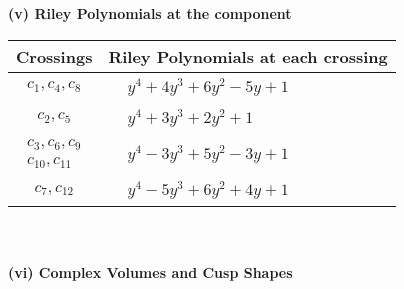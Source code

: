 \documentclass[1p]{elsarticle_modified}
\theoremstyle{definition}
\begin{document}
\newpage\renewcommand{\arraystretch}{1}
\flushleft \textbf{(v) Riley Polynomials at the component}\newline \\
\begin{tabular}{m{50pt}|m{274pt}}
Crossings & \hspace{64pt}Riley Polynomials at each crossing \\
\hline $$\begin{aligned}c_{1},c_{4},c_{8}\end{aligned}$$&$\begin{aligned}
&y^4+4 y^3+6 y^2-5 y+1
\end{aligned}$\\
\hline $$\begin{aligned}c_{2},c_{5}\end{aligned}$$&$\begin{aligned}
&y^4+3 y^3+2 y^2+1
\end{aligned}$\\
\hline $$\begin{aligned}c_{3},c_{6},c_{9}\\c_{10},c_{11}\end{aligned}$$&$\begin{aligned}
&y^4-3 y^3+5 y^2-3 y+1
\end{aligned}$\\
\hline $$\begin{aligned}c_{7},c_{12}\end{aligned}$$&$\begin{aligned}
&y^4-5 y^3+6 y^2+4 y+1
\end{aligned}$\\
\hline
\end{tabular}\\~\\
\newpage\flushleft \textbf{(vi) Complex Volumes and Cusp Shapes}
\end{document}
